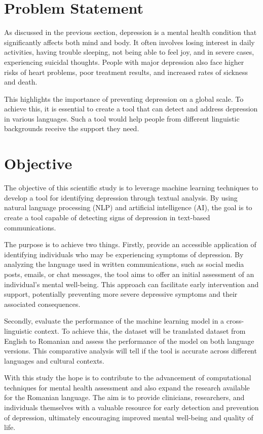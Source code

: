 \section{Problem Statement}
\quad As discussed in the previous section, depression is a mental health condition that significantly affects both mind and body. It often involves losing interest in daily activities, having trouble sleeping, not being able to feel joy, and in severe cases, experiencing suicidal thoughts. People with major depression also face higher risks of heart problems, poor treatment results, and increased rates of sickness and death.

This highlights the importance of preventing depression on a global scale. To achieve this, it is essential to create a tool that can detect and address depression in various languages. Such a tool would help people from different linguistic backgrounds receive the support they need.

\section{Objective}
\label{sec:ch1sec2}

\quad The objective of this scientific study is to leverage machine learning techniques to develop a tool for identifying depression through textual analysis. By using natural language processing (NLP) and artificial intelligence (AI), the goal is to create a tool capable of detecting signs of depression in text-based communications.

The purpose is to achieve two things. Firstly, provide an accessible application of identifying individuals who may be experiencing symptoms of depression. By analyzing the language used in written communications, such as social media posts, emails, or chat messages, the tool aims to offer an initial assessment of an individual's mental well-being. This approach can facilitate early intervention and support, potentially preventing more severe depressive symptoms and their associated consequences.

Secondly, evaluate the performance of the machine learning model in a cross-linguistic context. To achieve this, the dataset will be translated dataset from English to Romanian and assess the performance of the model on both language versions. This comparative analysis will tell if the tool is accurate across different languages and cultural contexts.

With this study the hope is to contribute to the advancement of computational techniques for mental health assessment and also expand the research available for the Romanian language. The aim is to provide clinicians, researchers, and individuals themselves with a valuable resource for early detection and prevention of depression, ultimately encouraging improved mental well-being and quality of life.

